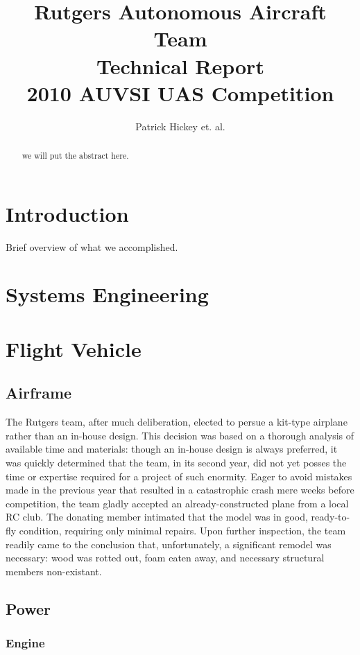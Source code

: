 \documentclass[10pt]{report}
\begin{document}
\title{Rutgers Autonomous Aircraft Team\\Technical Report\\2010 AUVSI UAS Competition}
\author{Patrick Hickey et. al.}


\begin{abstract}
we will put the abstract here.
\end{abstract}

\section{Introduction}

Brief overview of what we accomplished.

\section{Systems Engineering}

\section{Flight Vehicle}



\subsection{Airframe}
The Rutgers team, after much deliberation, elected to persue a kit-type airplane rather than an in-house design.  This decision was based on a thorough analysis of available time and materials: though an in-house design is always preferred, it was quickly determined that the team, in its second year, did not yet posses the time or expertise required for a project of such enormity.  Eager to avoid mistakes made in the previous year that resulted in a catastrophic crash mere weeks before  competition, the team gladly accepted an already-constructed plane from a local RC club.  The donating member intimated that the model was in good, ready-to-fly condition, requiring only minimal repairs.  Upon further inspection, the team readily came to the conclusion that, unfortunately, a significant remodel was necessary: wood was rotted out, foam eaten away, and necessary structural members non-existant.


\subsection{Power}

\subsubsection{Engine}
\end{document}
